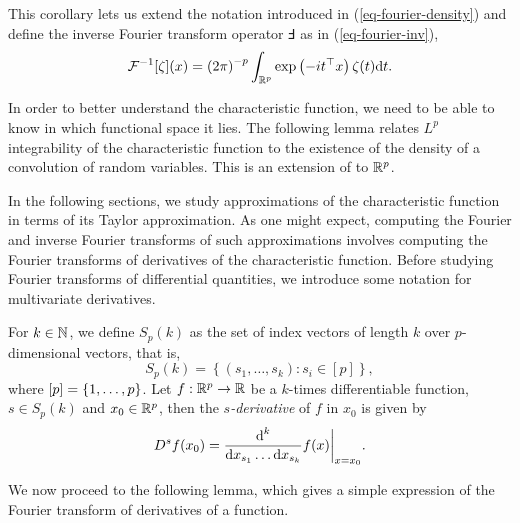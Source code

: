 This corollary lets us extend the notation introduced in (\ref{eq-fourier-density}) and define the inverse Fourier transform operator $\Finv$ as in (\ref{eq-fourier-inv}),
\begin{equation*}
    {\mathcal{F}^{-1}}[\zeta](x) = \left(2\pi\right)^{-p}\int_{\mathbb{R}^p} \exp\left(-i t^\top x\right) \zeta(t) \text{d} t.
\end{equation*}

In order to better understand the characteristic function, we need to be able to know in which functional space it lies. The following lemma relates $L^p$ integrability of the characteristic function to the existence of the density of a convolution of random variables. This is an extension of \cite[Lemma 2.4.4]{kolassa2006series} to ${\mathbb{R}^p}$.



In the following sections, we study approximations of the characteristic function in terms of its Taylor approximation. As one might expect, computing the Fourier and inverse Fourier transforms of such approximations involves computing the Fourier transforms of derivatives of the characteristic function. Before studying Fourier transforms of differential quantities, we introduce some notation for multivariate derivatives.

For $k \in \mathbb{N}$, we define $S_p(k)$ as the set of index vectors of length $k$ over $p$-dimensional vectors, that is,
\begin{equation*}
    S_p(k) = \left\{ (s_1, \ldots, s_k) : s_i \in [p] \right\},
\end{equation*}
where $[p] = {\left\{1, \ldots, p\right\}}$. Let $f : {\mathbb{R}^p} \rightarrow \mathbb{R}$ be a $k$-times differentiable function, $s \in S_p(k)$ and $x_0 \in {\mathbb{R}^p}$, then the \textit{$s$-derivative} of $f$ in $x_0$ is given by
\begin{equation*}
    D^s f(x_0) = \frac{\text{d}^k}{\text{d} x_{s_1} \ldots \text{d} x_{s_k}} f(x) \bigg|_{x=x_0}.
\end{equation*}

We now proceed to the following lemma, which gives a simple expression of the Fourier transform of derivatives of a function.

